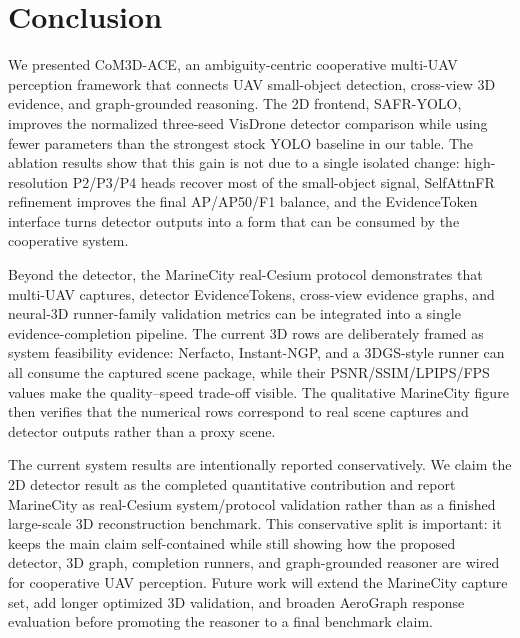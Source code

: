 \section{Conclusion}
\label{sec:conclusion}

We presented CoM3D-ACE, an ambiguity-centric cooperative multi-UAV perception
framework that connects UAV small-object detection, cross-view 3D evidence, and
graph-grounded reasoning. The 2D frontend, SAFR-YOLO, improves the normalized
three-seed VisDrone detector comparison while using fewer parameters than the
strongest stock YOLO baseline in our table. The ablation results show that this
gain is not due to a single isolated change: high-resolution P2/P3/P4 heads
recover most of the small-object signal, SelfAttnFR refinement improves the
final AP/AP50/F1 balance, and the EvidenceToken interface turns detector
outputs into a form that can be consumed by the cooperative system.

Beyond the detector, the MarineCity real-Cesium protocol demonstrates that
multi-UAV captures, detector EvidenceTokens, cross-view evidence graphs, and
neural-3D runner-family validation metrics can be integrated into a single
evidence-completion pipeline. The current 3D rows are deliberately framed as
system feasibility evidence: Nerfacto, Instant-NGP, and a 3DGS-style runner can
all consume the captured scene package, while their PSNR/SSIM/LPIPS/FPS values
make the quality--speed trade-off visible. The qualitative MarineCity figure
then verifies that the numerical rows correspond to real scene captures and
detector outputs rather than a proxy scene.

The current system results are intentionally reported conservatively. We claim
the 2D detector result as the completed quantitative contribution and report
MarineCity as real-Cesium system/protocol validation rather than as a finished
large-scale 3D reconstruction benchmark. This conservative split is important:
it keeps the main claim self-contained while still showing how the proposed
detector, 3D graph, completion runners, and graph-grounded reasoner are wired
for cooperative UAV perception. Future work will extend the MarineCity capture
set, add longer optimized 3D validation, and broaden AeroGraph response
evaluation before promoting the reasoner to a final benchmark claim.
